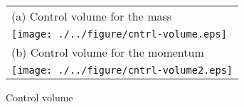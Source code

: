 \begin{figure}[t]
\begin{center}
  \begin{tabular}{l}
    (a) Control volume for the mass\\
  \texttt{[image: ./../figure/cntrl-volume.eps]}\\
    (b) Control volume for the momentum\\
  \texttt{[image: ./../figure/cntrl-volume2.eps]}\\
  \end{tabular}
\end{center}
  \caption{Control volume}
  \label{fig:cntrl-volume}
\end{figure}
